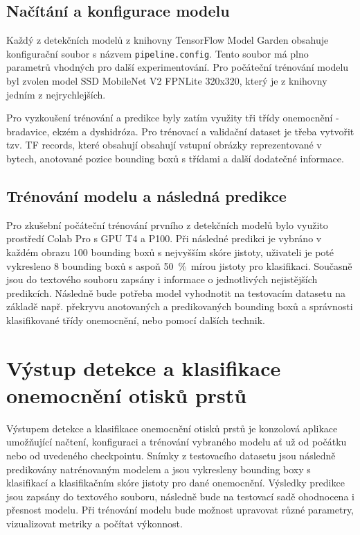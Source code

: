 \subsection{Načítání a konfigurace modelu}
Každý z detekčních modelů z knihovny TensorFlow Model Garden obsahuje konfigurační soubor s názvem \verb=pipeline.config=. Tento soubor má plno parametrů vhodných pro další experimentování. Pro počáteční trénování modelu byl zvolen model SSD MobileNet V2 FPNLite 320x320, který je z knihovny jedním z nejrychlejších.

Pro vyzkoušení trénování a predikce byly zatím využity tři třídy onemocnění - bradavice, ekzém a dyshidróza. Pro trénovací a validační dataset je třeba vytvořit tzv. TF records, které obsahují obsahují vstupní obrázky reprezentované v bytech, anotované pozice bounding boxů s třídami a další dodatečné informace.

\subsection{Trénování modelu a následná predikce}
Pro zkušební počáteční trénování prvního z detekčních modelů bylo využito prostředí Colab Pro s GPU T4 a P100. Při následné predikci je vybráno v každém obrazu 100 bounding boxů s nejvyšším skóre jistoty, uživateli je poté vykresleno 8 bounding boxů s aspoň 50~\%~mírou jistoty pro klasifikaci. Současně jsou do textového souboru zapsány i informace o jednotlivých nejistějších predikcích. Následně bude potřeba model vyhodnotit na testovacím datasetu na základě např. překryvu anotovaných a predikovaných bounding boxů a správnosti klasifikované třídy onemocnění, nebo pomocí dalších technik.


\section{Výstup detekce a klasifikace onemocnění otisků prstů}
Výstupem detekce a klasifikace onemocnění otisků prstů je konzolová aplikace umožňující načtení, konfiguraci a trénování vybraného modelu ať už od počátku nebo od uvedeného checkpointu. Snímky z testovacího datasetu jsou následně predikovány natrénovaným modelem a jsou vykresleny bounding boxy s klasifikací a klasifikačním skóre jistoty pro dané onemocnění. Výsledky predikce jsou zapsány do textového souboru, následně bude na testovací sadě ohodnocena i přesnost modelu. Při trénování modelu bude možnost upravovat různé parametry, vizualizovat metriky a počítat výkonnost.

